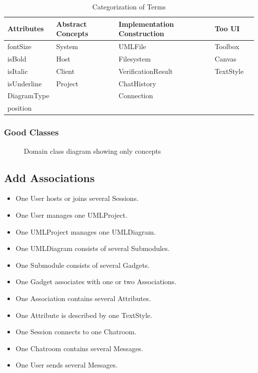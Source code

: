 \documentclass[12pt]{article}
\begin{document}
    \begin{table}[h]
        \centering
        \caption{Categorization of Terms}
        \begin{tabular}{l l l ll}
            \toprule
            \textbf{Attributes} & \textbf{Abstract Concepts} & \textbf{Implementation Construction}  & \textbf{Too UI}\\
            \midrule
            fontSize & System & UMLFile & Toolbox \\
            isBold & Host & Filesystem & Canvas \\
            isItalic & Client & VerificationResult & TextStyle \\
            isUnderline & Project & ChatHistory & \\
            DiagramType & & Connection & & \\
            position    & &            & & \\
            \bottomrule
        \end{tabular}
        \label{tab:categories}
    \end{table}

    \subsubsection{Good Classes}

    \begin{figure}[H]
        \centering
        
        \caption{Domain class diagram showing only concepts}
        \label{fig:dm}
    \end{figure}

    \subsection{Add Associations}
    \begin{itemize}
        \item One User hosts or joins several Sessions.
        \item One User manages one UMLProject.
        \item One UMLProject manages one UMLDiagram.
        \item One UMLDiagram consists of several Submodules.
        \item One Submodule consists of several Gadgets.
        \item One Gadget associates with one or two Associations.
        \item One Association contains several Attributes.
        \item One Attribute is described by one TextStyle.
        \item One Session connects to one Chatroom.
        \item One Chatroom contains several Messages.
        \item One User sends several Messages.
    \end{itemize}
\end{document}
